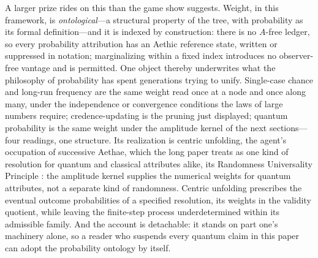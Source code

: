 \documentclass[11pt]{article}
\theoremstyle{definition}
\begin{document}
A larger prize rides on this than the game show suggests. Weight, in this framework, is \emph{ontological}---a structural property of the tree, with probability as its formal definition---and it is indexed by construction: there is no $A$-free ledger, so every probability attribution has an Aethic reference state, written or suppressed in notation; marginalizing within a fixed index introduces no observer-free vantage and is permitted. One object thereby underwrites what the philosophy of probability has spent generations trying to unify. Single-case chance and long-run frequency are the same weight read once at a node and once along many, under the independence or convergence conditions the laws of large numbers require; credence-updating is the pruning just displayed; quantum probability is the same weight under the amplitude kernel of the next sections---four readings, one structure. Its realization is centric unfolding, the agent's occupation of successive Aethae, which the long paper treats as one kind of resolution for quantum and classical attributes alike, its Randomness Universality Principle \cite{Aethus}: the amplitude kernel supplies the numerical weights for quantum attributes, not a separate kind of randomness. Centric unfolding prescribes the eventual outcome probabilities of a specified resolution, its weights in the validity quotient, while leaving the finite-step process underdetermined within its admissible family. And the account is detachable: it stands on part one's machinery alone, so a reader who suspends every quantum claim in this paper can adopt the probability ontology by itself.
\end{document}
